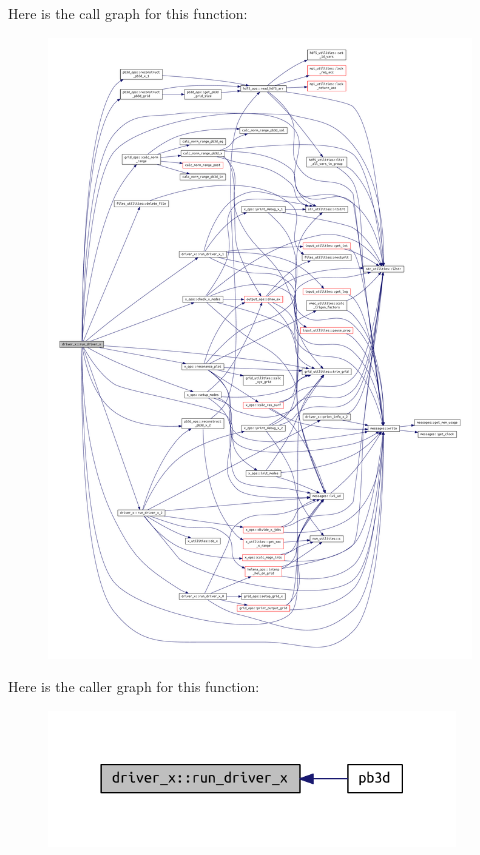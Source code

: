 Here is the call graph for this function\+:
\nopagebreak
\begin{figure}[H]
\begin{center}
\leavevmode
\includegraphics[width=350pt]{namespacedriver__x_ada3d72a0929daaa5e3da585246d62281_cgraph}
\end{center}
\end{figure}
Here is the caller graph for this function\+:\nopagebreak
\begin{figure}[H]
\begin{center}
\leavevmode
\includegraphics[width=306pt]{namespacedriver__x_ada3d72a0929daaa5e3da585246d62281_icgraph}
\end{center}
\end{figure}
\mbox{\label{namespacedriver__x_a2b82a9bc6c0f4af9f3468d03fedc008e}} 
